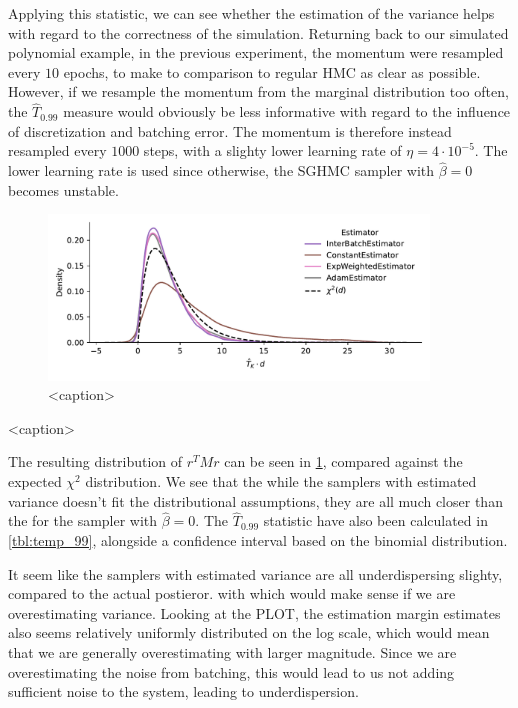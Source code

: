 Applying this statistic, we can see whether the estimation of the variance helps with regard to the correctness of the simulation. 
Returning back to our simulated polynomial example, in the previous experiment, the momentum were resampled every $10$ epochs, to make to comparison to regular HMC as clear as possible. 
However, if we resample the momentum from the marginal distribution too often, the $\hat{T}_{0.99}$ measure would obviously be less informative with regard to the influence of discretization and batching error. 
The momentum is therefore instead resampled every $1000$ steps, with a slighty lower learning rate of $\eta=4 \cdot 10^{-5}$.
The lower learning rate is used since otherwise, the SGHMC sampler with $\hat{\beta}=0$ becomes unstable. 
\begin{figure}[htb]
    \centering
    \includegraphics[width=0.9\textwidth]{Figures/temperature_sum_chi2_comp.pdf}
    \caption{<caption>}
    \label{fig:temperature_sum_chi2_comp}
\end{figure}
\begin{table}[htb]
    \centering
    
    \caption{<caption>}
    \label{tbl:temp_99}
\end{table}
The resulting distribution of $r^T M r$ can be seen in \cref{fig:temperature_sum_chi2_comp}, compared against the expected $\chi^2$ distribution. 
We see that the while the samplers with estimated variance doesn't fit the distributional assumptions, they are all much closer than the for the sampler with $\hat \beta = 0$.
The $\hat T_{0.99}$ statistic have also been calculated in \cref{tbl:temp_99}, alongside a confidence interval based on the binomial distribution.


It seem like the samplers with estimated variance are all underdispersing slighty, compared to the actual postieror. with  which would make sense if we are overestimating variance.
Looking at the PLOT, the estimation margin estimates also seems relatively uniformly distributed on the log scale, which would mean that we are generally overestimating with larger magnitude. 
Since we are overestimating the noise from batching, this would lead to us not adding sufficient noise to the system, leading to underdispersion.

